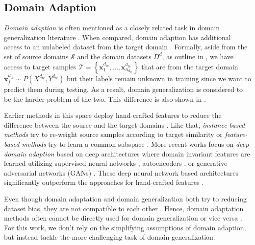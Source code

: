 \subsection{Domain Adaption}

\emph{Domain adaption} is often mentioned as a closely related task in domain generalization literature \citep{MotiianPAD17, VolpiM19, QiaoZP20}. When compared, domain adaption has additional access to an unlabeled dataset from the target domain \citep{mancini2020, Csurka17}. Formally, aside from the set of source domains $\mathcal{S}$ and the domain datasets $D^d$, as outline in , we have access to target samples $\mathcal{T} = \left\{\mathbf{x}_{1}^{d_\mathrm{te}},\dots,\mathbf{x}_{n_{d_{\mathrm{te}}}}^{d_\mathrm{te}}\right\}$ that are from the target domain $\mathbf{x}_j^{d_{ \mathrm{te}}} \sim P(X^{d_{ \mathrm{te}}},Y^{d_{ \mathrm{te}}})$ but their labels remain unknown in training since we want to predict them during testing. As a result, domain generalization is considered to be the harder problem of the two. This difference is also shown in .

Earlier methods in this space deploy hand-crafted features to reduce the difference between the source and the target domains \citep{ManciniPBC018}. Like that, \emph{instance-based methods} try to re-weight source samples according to target similarity \citep{GongGS13, HuangSGBS06, YamadaSR12} or \emph{feature-based methods} try to learn a common subspace \citep{FernandoHST13, GongSSG12, LongD0SGY13, BaktashmotlaghHLS13}. More recent works focus on \emph{deep domain adaption} based on deep architectures where domain invariant features are learned utilizing supervised neural networks \citep{BousmalisTSKE16, CarlucciPCRB17, GaninL15, GhifaryKZBL16}, autoencoders \citep{ZengOWW14}, or generative adversarial networks (GANs) \citep{BousmalisSDEK17, ShrivastavaPTSW17, TzengHSD17}. These deep neural network based architectures significantly outperform the approaches for hand-crafted features \citep{ManciniPBC018}.

Even though domain adaptation and domain generalization both try to reducing dataset bias, they are not compatible to each other \citep{GhifaryBKZ17}. Hence, domain adaptation methods often cannot be directly used for domain generalization or vice versa \citep{GhifaryBKZ17}. For this work, we don't rely on the simplifying assumptions of domain adaption, but instead tackle the more challenging task of domain generalization.

